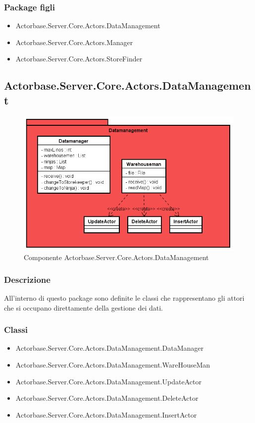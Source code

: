 \documentclass[a4paper]{article}
\begin{document}
			\subsubsection{Package figli}
			\begin{itemize}
				\item Actorbase.Server.Core.Actors.DataManagement
				\item Actorbase.Server.Core.Actors.Manager
				\item Actorbase.Server.Core.Actors.StoreFinder
			\end{itemize}
			
			\subsection{Actorbase.Server.Core.Actors.DataManagement}
			\begin{figure} [H]
			\centering
			\includegraphics[scale=0.55]{Server/Package/DatamanagementLevel.png}
			\caption{Componente Actorbase.Server.Core.Actors.DataManagement}
			\end{figure}
			\subsubsection{Descrizione}
				All'interno di questo package sono definite le classi che rappresentano gli attori che si occupano direttamente della gestione dei dati.
			\subsubsection{Classi}
			\begin{itemize}
				\item Actorbase.Server.Core.Actors.DataManagement.DataManager
				\item Actorbase.Server.Core.Actors.DataManagement.WareHouseMan
				\item Actorbase.Server.Core.Actors.DataManagement.UpdateActor
				\item Actorbase.Server.Core.Actors.DataManagement.DeleteActor
				\item Actorbase.Server.Core.Actors.DataManagement.InsertActor
			\end{itemize}
			
\end{document}
